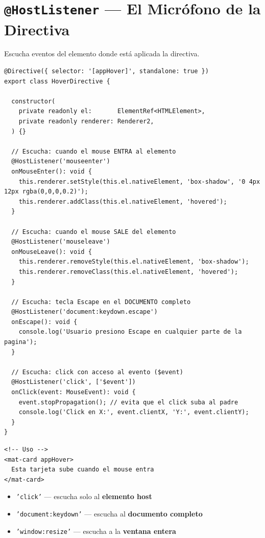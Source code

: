\documentclass[12pt, a4paper]{article}
\begin{document}
\section{  \texttt{@HostListener} --- El Micrófono de la Directiva}

Escucha eventos del elemento donde está aplicada la directiva.

\begin{lstlisting}
@Directive({ selector: '[appHover]', standalone: true })
export class HoverDirective {

  constructor(
    private readonly el:       ElementRef<HTMLElement>,
    private readonly renderer: Renderer2,
  ) {}

  // Escucha: cuando el mouse ENTRA al elemento
  @HostListener('mouseenter')
  onMouseEnter(): void {
    this.renderer.setStyle(this.el.nativeElement, 'box-shadow', '0 4px 12px rgba(0,0,0,0.2)');
    this.renderer.addClass(this.el.nativeElement, 'hovered');
  }

  // Escucha: cuando el mouse SALE del elemento
  @HostListener('mouseleave')
  onMouseLeave(): void {
    this.renderer.removeStyle(this.el.nativeElement, 'box-shadow');
    this.renderer.removeClass(this.el.nativeElement, 'hovered');
  }

  // Escucha: tecla Escape en el DOCUMENTO completo
  @HostListener('document:keydown.escape')
  onEscape(): void {
    console.log('Usuario presiono Escape en cualquier parte de la pagina');
  }

  // Escucha: click con acceso al evento ($event)
  @HostListener('click', ['$event'])
  onClick(event: MouseEvent): void {
    event.stopPropagation(); // evita que el click suba al padre
    console.log('Click en X:', event.clientX, 'Y:', event.clientY);
  }
}
\end{lstlisting}

\begin{lstlisting}
<!-- Uso -->
<mat-card appHover>
  Esta tarjeta sube cuando el mouse entra
</mat-card>
\end{lstlisting}

\begin{tcolorbox}[analogia, title={\emoji{microphone} \emoji{headphone} Los Tres Micrófonos}]
  \begin{itemize}
    \item {} \texttt{'click'} --- escucha solo al \textbf{elemento host}
    \item {} \texttt{'document:keydown'} --- escucha al \textbf{documento completo}
    \item {} \texttt{'window:resize'} --- escucha a la \textbf{ventana entera}
  \end{itemize}
\end{tcolorbox}
\end{document}
